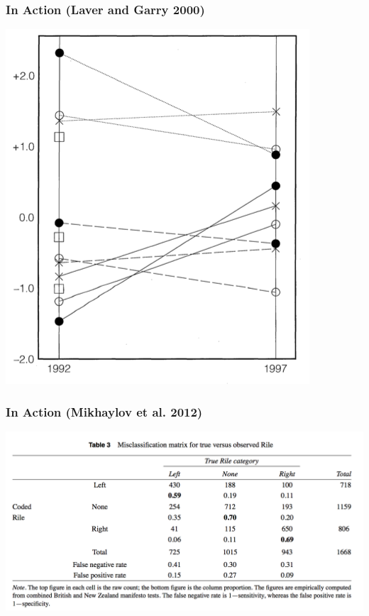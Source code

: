 \documentclass[11pt,compress,professionalfonts]{beamer}
\begin{document}
\begin{frame}[t]\frametitle{In Action (Laver and Garry 2000)}

\centerline{\includegraphics[scale=.7]{pictures/lg-shrinkage}}


\end{frame}
\begin{frame}[t]\frametitle{In Action (Mikhaylov et al. 2012)}

\centerline{\includegraphics[scale=.9]{pictures/slava-rile3}}

\end{frame}
\end{document}
